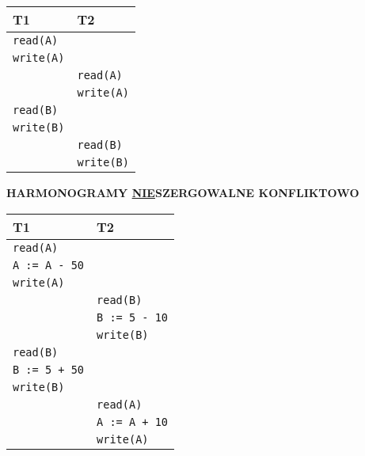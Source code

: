 \documentclass[a5paper,6pt]{article}
\begin{document}
    \begin{center}
    \begin{tabular}{|p{4cm}|p{4cm}|}
        \hline
        \textbf{T1} & \textbf{T2} \\
        \hline
        \texttt{read(A)} & \texttt{}\\
        \texttt{write(A)} & \texttt{}\\
        \texttt{} & \texttt{read(A)}\\
        \texttt{} & \texttt{write(A)}\\
        \texttt{read(B)} & \texttt{}\\
        \texttt{write(B)} & \texttt{}\\
        \texttt{} & \texttt{read(B)}\\
        \texttt{} & \texttt{write(B)}\\
        \hline
    \end{tabular}
    \end{center}

    \textbf{HARMONOGRAMY \underline{NIE}SZERGOWALNE KONFLIKTOWO}

    \begin{center}
    \begin{tabular}{|p{4cm}|p{4cm}|}
        \hline
        \textbf{T1} & \textbf{T2} \\
        \hline
        \texttt{read(A)} & \texttt{}\\
        \texttt{A := A - 50} & \texttt{}\\
        \texttt{write(A)} & \texttt{}\\
        \texttt{} & \texttt{read(B)}\\
        \texttt{} & \texttt{B := 5 - 10}\\
        \texttt{} & \texttt{write(B)}\\
        \texttt{read(B)} & \texttt{}\\
        \texttt{B := 5 + 50} & \texttt{}\\
        \texttt{write(B)} & \texttt{}\\
        \texttt{} & \texttt{read(A)}\\
        \texttt{} & \texttt{A := A + 10}\\
        \texttt{} & \texttt{write(A)}\\
        \hline
    \end{tabular}
    \end{center}

\pagebreak

\end{document}
